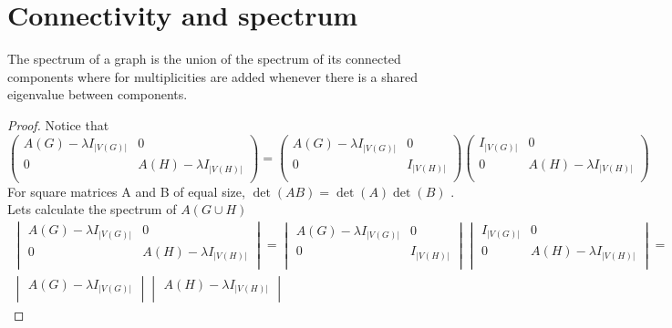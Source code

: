 \documentclass[a4paper, 11pt, oneside]{article}
\newenvironment{problem}[1]
  {\renewcommand\theinnercustomprob{#1}\innercustomprob}
  {\endinnercustomprob}
\newcommand\abs[1]{\left|#1\right|}
\begin{document}
\section{Connectivity and spectrum}

\begin{problem}{3.1}\label{problem3.1}
The spectrum of a graph is the union of the spectrum of its connected components where for multiplicities are added whenever there is a shared eigenvalue between components.
\end{problem}

\begin{proof}
Notice that
\begin{equation*}
\begin{pmatrix}
A(G) - \lambda I_{\abs{V(G)}} & 0 \\ 
0             & A(H) - \lambda I_{\abs{V(H)}} \\
\end{pmatrix} =
\begin{pmatrix}
A(G) - \lambda I_{\abs{V(G)}} & 0 \\ 
0             &  I_{\abs{V(H)}} \\
\end{pmatrix}
\begin{pmatrix}
 I_{\abs{V(G)}} & 0 \\ 
0             & A(H) - \lambda I_{\abs{V(H)}} \\
\end{pmatrix}
\end{equation*}
For square matrices A and B of equal size, $\det(AB)=\det(A)\det(B)$ \cite{determinant}.
Lets calculate the spectrum of $A(G\cup H)$ 
\begin{multline*}
\begin{vmatrix}
A(G) - \lambda I_{\abs{V(G)}} & 0 \\ 
0             & A(H) - \lambda I_{\abs{V(H)}} \\
\end{vmatrix} =
\begin{vmatrix}
A(G) - \lambda I_{\abs{V(G)}} & 0 \\ 
0             &  I_{\abs{V(H)}} \\
\end{vmatrix}
\begin{vmatrix}
 I_{\abs{V(G)}} & 0 \\ 
0             & A(H) - \lambda I_{\abs{V(H)}} \\
\end{vmatrix} =\\
\begin{vmatrix}
A(G) - \lambda I_{\abs{V(G)}}\\
\end{vmatrix}
\begin{vmatrix}
A(H) - \lambda I_{\abs{V(H)}} \\
\end{vmatrix}
\end{multline*}

\end{proof}
\end{document}
